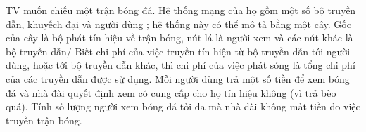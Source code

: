 TV muốn chiếu một trận bóng đá. Hệ thống mạng của họ gồm một số bộ  truyền dẫn, khuyếch đại và người dùng ; hệ thống này có thể mô tả bằng  một cây.    Gốc của cây là bộ phát tín hiệu về trận bóng, nút lá là người xem và các  nút khác là bộ truyền dẫn/ Biết chi phí của việc truyền tín hiện từ bộ truyền dẫn tới người dùng,  hoặc tới bộ truyền dẫn khác, thì chi phí của việc phát sóng là tổng chi phí  của các truyền dẫn được sử dụng. Mỗi người dùng trả một số tiền để xem bóng đá và nhà đài quyết định xem có  cung cấp cho họ tín hiệu không (vì trả bèo quá). Tính số lượng người xem bóng đá tối đa mà nhà đài không mất tiền do  việc truyền trận bóng.